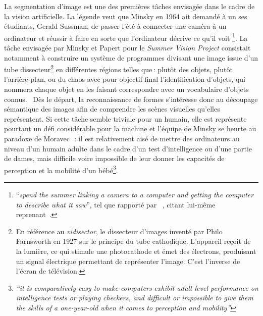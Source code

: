 La segmentation d'image est une des premières tâches envisagée dans le cadre de la vision artificielle.
La légende veut que Minsky en 1964 ait demandé à un ses étudiants, Gerald Sussman, de \og passer l'été à connecter une caméra à un ordinateur et réussir à faire en sorte que l'ordinateur décrive ce qu'il voit \fg\footnote{``\emph{spend the summer linking a camera to a computer and getting the computer to describe what it saw}'', tel que rapporté par ~\citet{szeliski_computer_2011}, citant lui-même~\citet{boden_mind_2008} reprenant~\citet{crevier_ai_1993}.}.
La tâche envisagée par Minsky et Papert pour le \emph{Summer Vision Project} consistait notamment à \og construire un système de programmes divisant une image issue d'un tube dissecteur\footnote{En référence au \emph{vidisector}, le dissecteur d'images inventé par Philo Farnsworth en 1927 sur le principe du tube cathodique. L'appareil reçoit de la lumière, ce qui stimule une photocathode et émet des électrons, produisant un signal électrique permettant de représenter l'image. C'est l'inverse de l'écran de télévision.} en différentes régions telles que\,: plutôt des objets, plutôt l'arrière-plan, ou du chaos\fg{} avec pour objectif final \og l'identification d'objets, qui nommera chaque objet en les faisant correspondre avec un vocabulaire d'objets connus.\fg{}~\cite{papert_summer_1966}
Dès le départ, la reconnaissance de formes s'intéresse donc au découpage sémantique des images afin de comprendre les scènes visuelles qu'elles représentent.
Si cette tâche semble triviale pour un humain, elle est représente pourtant un défi considérable pour la machine et l'équipe de Minsky se heurte au paradoxe de Moravec~\cite{moravec_mind_1988}\,: \og il est relativement aisé de mettre des ordinateurs au niveau d'un humain adulte dans le cadre d'un test d'intelligence ou d'une partie de dames, mais difficile voire impossible de leur donner les capacités de perception et la mobilité d'un bébé\fg{}\footnote{\emph{``it is comparatively easy to make computers exhibit adult level performance on intelligence tests or playing checkers, and difficult or impossible to give them the skills of a one-year-old when it comes to perception and mobility''}}.

